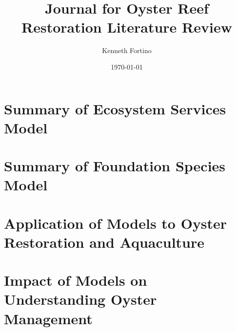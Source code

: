 \documentclass{article}
\begin{document}
\title{Journal for Oyster Reef Restoration Literature Review}
\author{Kenneth Fortino}
\date{\today}

\maketitle

\section{Summary of Ecosystem Services Model}

\section{Summary of Foundation Species Model}

\section{Application of Models to Oyster Restoration and Aquaculture}



\section{Impact of Models on Understanding Oyster Management}








\end{document}
